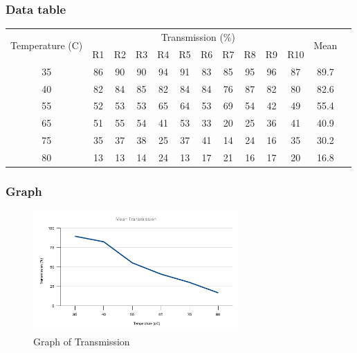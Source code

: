 \documentclass{thomasClass}
\begin{document}
\subsubsection{Data table}
\begin{table}[H]
\centering
\begin{tabularx}{0.7\textwidth}{c|cccccccccccc}
\multicolumn{1}{c}{\multirow{2}{*}{Temperature (C)}} & \multicolumn{10}{c}{Transmission (\%)} & \multirow{2}{*}{Mean} \\
\multicolumn{1}{c}{} & \multicolumn{1}{l}{R1} & \multicolumn{1}{l}{R2} & \multicolumn{1}{l}{R3} & \multicolumn{1}{l}{R4} & \multicolumn{1}{l}{R5} & \multicolumn{1}{l}{R6} & \multicolumn{1}{l}{R7} & \multicolumn{1}{l}{R8} & \multicolumn{1}{l}{R9} & \multicolumn{1}{l}{R10} &  \\
35 & 86 & 90 & 90 & 94 & 91 & 83 & 85 & 95 & 96 & 87 & 89.7 \\
40 & 82 & 84 & 85 & 82 & 84 & 84 & 76 & 87 & 82 & 80 & 82.6 \\
55 & 52 & 53 & 53 & 65 & 64 & 53 & 69 & 54 & 42 & 49 & 55.4 \\
65 & 51 & 55 & 54 & 41 & 53 & 33 & 20 & 25 & 36 & 41 & 40.9 \\
75 & 35 & 37 & 38 & 25 & 37 & 41 & 14 & 24 & 16 & 35 & 30.2 \\
80 & 13 & 13 & 14 & 24 & 13 & 17 & 21 & 16 & 17 & 20 & 16.8
\end{tabularx}
\end{table}
\subsubsection{Graph}
\begin{figure}[H]
    \centering
    \includegraphics[width=0.7\textwidth]{RPA4-GRAPH3.png}
    \caption{Graph of Transmission}
\end{figure}
\end{document}
